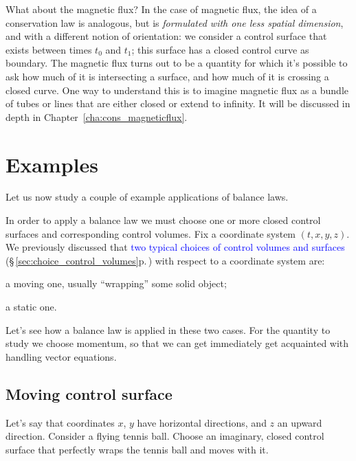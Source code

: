\documentclass[a4paper,12pt,%
onecolumn,oneside,%
british%
]{memoir}
\renewcommand*{\|}[1][]{\nonscript\:#1\vert\nonscript\:\mathopen{}}
\newcommand*{\sect}{\S}%
\newcommand*{\chap}{Chapter}%
\renewcommand*{\autoref}[3][\sect\,\ref]{\textcolor{blue}{#3} {\color{blue}\scriptsize(\faIcon[regular]{eye}\;#1{#2}\;p.\,\pageref{#2})}}
\newcommand*{\yti}{t_{0}}
\newcommand*{\ytf}{t_{1}}
\begin{document}
\begin{extra}{What about the magnetic flux?}
  In the case of magnetic flux, the idea of a conservation law is analogous, but is \emph{formulated with one less spatial dimension}, and with a different notion of orientation: we consider a control surface that exists between times $\yti$ and $\ytf$; this surface has a closed control curve as boundary. The magnetic flux turns out to be a quantity for which it's possible to ask how much of it is intersecting a surface, and how much of it is crossing a closed curve. One way to understand this is to imagine magnetic flux as a bundle of tubes or lines that are either closed or extend to infinity. It will be discussed in depth in \chap~\ref{cha:cons_magneticflux}.
\end{extra}


\section{Examples}
\label{sec:example_balance_vect}

Let us now study a couple of example applications of balance laws.

In order to apply a balance law we must choose one or more closed control surfaces and corresponding control volumes. Fix a coordinate system $(t,x,y,z)$. We previously discussed that \autoref{sec:choice_control_volumes}{two typical choices of control volumes and surfaces} with respect to a coordinate system are:
\begin{enumerate*}[label=(\alph*)]
\item a moving one, usually \enquote{wrapping} some solid object;
\item a static one.
\end{enumerate*}
Let's see how a balance law is applied in these two cases. For the quantity to study we choose momentum, so that we can get immediately get acquainted with handling vector equations.

\subsection{Moving control surface}
\label{sec:example_balance_moving}

Let's say that coordinates $x$, $y$ have horizontal directions, and $z$ an upward direction. Consider a flying tennis ball. Choose an imaginary, closed control surface that perfectly wraps the tennis ball and moves with it.
\end{document}
